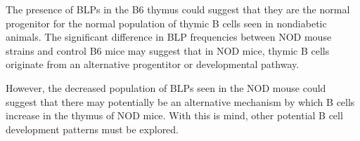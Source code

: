 The presence of BLPs in the B6 thymus could suggest that they are the normal progenitor for the normal population of thymic B cells seen in nondiabetic animals.
The significant difference in BLP frequencies between NOD mouse strains and control B6 mice may suggest that in NOD mice, thymic B cells originate from an alternative progentitor or developmental pathway.

However, the decreased population of BLPs seen in the NOD mouse could suggest that there may potentially be an alternative mechanism by which B cells increase in the thymus of NOD mice.
With this is mind, other potential B cell development patterns must be explored.





